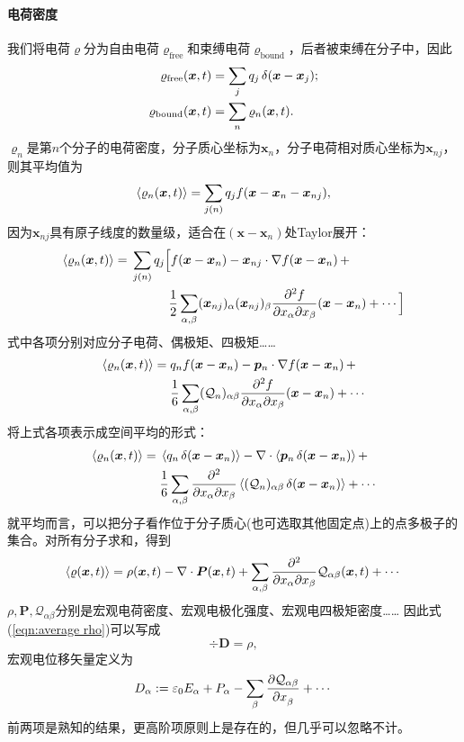 \paragraph{电荷密度}
我们将电荷$\varrho$分为自由电荷$\varrho_\text{free}$和束缚电荷$\varrho_\text{bound}$，后者被束缚在分子中，因此
\begin{align*}
    \varrho_\text{free}(\bm x,t)&=\sum_jq_j\mathop{}\!\delta(\bm x-\bm x_j);\\
    \varrho_\text{bound}(\bm x,t)&=\sum_n\varrho_n(\bm x,t).
\end{align*}
$\varrho_n$是第$n$个分子的电荷密度，分子质心坐标为$\bm x_n$，分子电荷相对质心坐标为$\bm x_{nj}$，则其平均值为
\[
    \left\langle \varrho_n(\bm x,t)\right\rangle=\sum_{j(n)}q_jf(\bm x-\bm x_n-\bm x_{nj}),
\]
因为$\bm x_{nj}$具有原子线度的数量级，适合在$(\bm x-\bm x_n)$处Taylor展开： 
\begin{align*}
    \left\langle \varrho_n(\bm x,t)\right\rangle={}&\sum_{j(n)}q_j\Big[f(\bm x-\bm x_n)-\bm x_{nj}\cdot\nabla f(\bm x-\bm x_n)\,+\\
    &\qquad\quad\frac12\sum_{\alpha,\beta}(\bm x_{nj})_\alpha(\bm x_{nj})_\beta\frac{\partial^2 f}{\partial x_\alpha\partial x_\beta}(\bm x-\bm x_n)+\cdots\Big]
\end{align*}
式中各项分别对应分子电荷、偶极矩、四极矩……
\begin{align*}
    \left\langle \varrho_n(\bm x,t)\right\rangle={}&q_nf(\bm x-\bm x_n)-\bm p_n\cdot\nabla f(\bm x-\bm x_n)\,+\\
    &\frac16\sum_{\alpha,\beta}(\mathcal Q_n)_{\alpha\beta}\frac{\partial^2 f}{\partial x_\alpha\partial x_\beta}(\bm x-\bm x_n)+\cdots
\end{align*}
将上式各项表示成空间平均的形式：
\begin{align*}
    \left\langle \varrho_n(\bm x,t)\right\rangle={}&\left\langle q_n\mathop{}\!\delta(\bm x-\bm x_n)\right\rangle-\nabla\cdot\left\langle \bm p_n\mathop{}\!\delta(\bm x-\bm x_n)\right\rangle+\,\\
    &\frac16\sum_{\alpha,\beta}\frac{\partial^2 }{\partial x_\alpha\partial x_\beta}\left\langle (\mathcal Q_n)_{\alpha\beta}\mathop{}\!\delta(\bm x-\bm x_n)\right\rangle+\cdots
\end{align*}
就平均而言，可以把分子看作位于分子质心(也可选取其他固定点)上的点多极子的集合。对所有分子求和，得到
\[
    \left\langle \varrho(\bm x,t)\right\rangle=\rho(\bm x,t)-\nabla\cdot\bm P(\bm x,t)+\sum_{\alpha,\beta}\frac{\partial^2 }{\partial x_\alpha\partial x_\beta}\mathcal Q_{\alpha\beta}(\bm x,t)+\cdots
\]
$\rho,\bm P,\mathcal Q_{\alpha\beta}$分别是宏观电荷密度、宏观电极化强度、宏观电四极矩密度……
因此式(\ref{eqn:average rho})可以写成 
\[
    \div\bm D=\rho,
\]
宏观电位移矢量定义为
\[
    D_\alpha:=\varepsilon_0E_\alpha+P_\alpha-\sum_\beta\frac{\partial^{\;\!\!}\mathcal Q_{\alpha\beta}}{\partial x_\beta^{\;\!\!}}+\cdots
\]
前两项是熟知的结果，更高阶项原则上是存在的，但几乎可以忽略不计。
